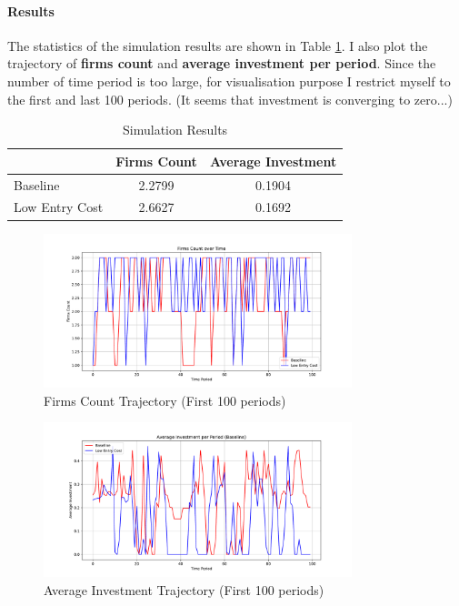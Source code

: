 \documentclass[12pt]{article}[margin=1in]
\begin{document}
\paragraph{Results} The statistics of the simulation results are shown in Table \ref{tab:simulation_results}. I also plot the trajectory of \textbf{firms count} and \textbf{average investment per period}. Since the number of time period is too large, for visualisation purpose I restrict myself to the first and last 100 periods. (It seems that investment is converging to zero...)

\begin{table}[!htbp]
    \centering
    \begin{tabular}{lcc}
        \toprule
                       & Firms Count & Average Investment \\
        \midrule
        Baseline       & 2.2799      & 0.1904             \\
        Low Entry Cost & 2.6627      & 0.1692             \\
        \bottomrule
    \end{tabular}
    \caption{Simulation Results}
    \label{tab:simulation_results}
\end{table}

\newpage
\begin{figure}[!htbp]
    \centering
    \includegraphics[width=0.8\textwidth]{../Figures/Firms_count_start.pdf}
    \caption{Firms Count Trajectory (First 100 periods)}
\end{figure}
\begin{figure}[!htbp]
    \centering
    \includegraphics[width=0.8\textwidth]{../Figures/Average_investment_trajectory_start.pdf}
    \caption{Average Investment Trajectory (First 100 periods)}
\end{figure}
\end{document}
